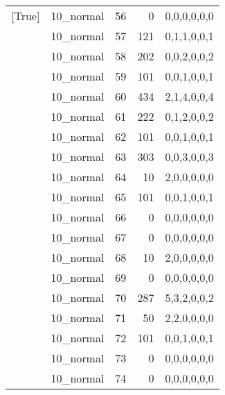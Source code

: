 \begin{tabular}{llrrl}
 [True]          & 10\_normal           &            56 &                     0 & 0,0,0,0,0,0   \\
 [True]          & 10\_normal           &            57 &                   121 & 0,1,1,0,0,1   \\
 [True]          & 10\_normal           &            58 &                   202 & 0,0,2,0,0,2   \\
 [True]          & 10\_normal           &            59 &                   101 & 0,0,1,0,0,1   \\
 [True]          & 10\_normal           &            60 &                   434 & 2,1,4,0,0,4   \\
 [True]          & 10\_normal           &            61 &                   222 & 0,1,2,0,0,2   \\
 [True]          & 10\_normal           &            62 &                   101 & 0,0,1,0,0,1   \\
 [True]          & 10\_normal           &            63 &                   303 & 0,0,3,0,0,3   \\
 [True]          & 10\_normal           &            64 &                    10 & 2,0,0,0,0,0   \\
 [True]          & 10\_normal           &            65 &                   101 & 0,0,1,0,0,1   \\
 [True]          & 10\_normal           &            66 &                     0 & 0,0,0,0,0,0   \\
 [True]          & 10\_normal           &            67 &                     0 & 0,0,0,0,0,0   \\
 [True]          & 10\_normal           &            68 &                    10 & 2,0,0,0,0,0   \\
 [True]          & 10\_normal           &            69 &                     0 & 0,0,0,0,0,0   \\
 [True]          & 10\_normal           &            70 &                   287 & 5,3,2,0,0,2   \\
 [True]          & 10\_normal           &            71 &                    50 & 2,2,0,0,0,0   \\
 [True]          & 10\_normal           &            72 &                   101 & 0,0,1,0,0,1   \\
 [True]          & 10\_normal           &            73 &                     0 & 0,0,0,0,0,0   \\
 [True]          & 10\_normal           &            74 &                     0 & 0,0,0,0,0,0   \\

\end{tabular}
